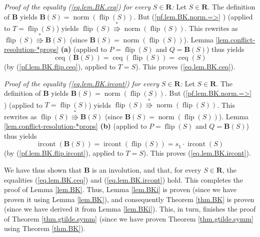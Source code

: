 \documentclass[numbers=enddot,12pt,final,onecolumn,notitlepage]{scrartcl}%
\theoremstyle{definition}
\begin{document}
\textit{Proof of the equality (\ref{eq.lem.BK.ceq}) for every }$S\in
\mathbf{R}$\textit{:} Let $S\in\mathbf{R}$. The definition of $\mathbf{B}$
yields $\mathbf{B}\left(  S\right)  =\operatorname*{norm}\left(
\operatorname*{flip}\left(  S\right)  \right)  $. But (\ref{pf.lem.BK.norm.=>}%
) (applied to $T=\operatorname*{flip}\left(  S\right)  $) yields
$\operatorname*{flip}\left(  S\right)  \overset{\ast}{\Rrightarrow
}\operatorname*{norm}\left(  \operatorname*{flip}\left(  S\right)  \right)  $.
This rewrites as $\operatorname*{flip}\left(  S\right)  \overset{\ast
}{\Rrightarrow}\mathbf{B}\left(  S\right)  $ (since $\mathbf{B}\left(
S\right)  =\operatorname*{norm}\left(  \operatorname*{flip}\left(  S\right)
\right)  $). Lemma \ref{lem.conflict-resolution-*props} \textbf{(a)} (applied
to $P=\operatorname*{flip}\left(  S\right)  $ and $Q=\mathbf{B}\left(
S\right)  $) thus yields
\[
\operatorname*{ceq}\left(  \mathbf{B}\left(  S\right)  \right)
=\operatorname*{ceq}\left(  \operatorname*{flip}\left(  S\right)  \right)
=\operatorname*{ceq}\left(  S\right)
\]
(by (\ref{pf.lem.BK.flip.ceq}), applied to $T=S$). This proves
(\ref{eq.lem.BK.ceq}).

\textit{Proof of the equality (\ref{eq.lem.BK.ircont}) for every }%
$S\in\mathbf{R}$\textit{:} Let $S\in\mathbf{R}$. The definition of
$\mathbf{B}$ yields $\mathbf{B}\left(  S\right)  =\operatorname*{norm}\left(
\operatorname*{flip}\left(  S\right)  \right)  $. But (\ref{pf.lem.BK.norm.=>}%
) (applied to $T=\operatorname*{flip}\left(  S\right)  $) yields
$\operatorname*{flip}\left(  S\right)  \overset{\ast}{\Rrightarrow
}\operatorname*{norm}\left(  \operatorname*{flip}\left(  S\right)  \right)  $.
This rewrites as $\operatorname*{flip}\left(  S\right)  \overset{\ast
}{\Rrightarrow}\mathbf{B}\left(  S\right)  $ (since $\mathbf{B}\left(
S\right)  =\operatorname*{norm}\left(  \operatorname*{flip}\left(  S\right)
\right)  $). Lemma \ref{lem.conflict-resolution-*props} \textbf{(b)} (applied
to $P=\operatorname*{flip}\left(  S\right)  $ and $Q=\mathbf{B}\left(
S\right)  $) thus yields
\[
\operatorname*{ircont}\left(  \mathbf{B}\left(  S\right)  \right)
=\operatorname*{ircont}\left(  \operatorname*{flip}\left(  S\right)  \right)
=s_{1}\cdot\operatorname*{ircont}\left(  S\right)
\]
(by (\ref{pf.lem.BK.flip.ircont}), applied to $T=S$). This proves
(\ref{eq.lem.BK.ircont}).

We have thus shown that $\mathbf{B}$ is an involution, and that, for every
$S\in\mathbf{R}$, the equalities (\ref{eq.lem.BK.ceq}) and
(\ref{eq.lem.BK.ircont}) hold. This completes the proof of Lemma \ref{lem.BK}.
Thus, Lemma \ref{lem.BKi} is proven (since we have proven it using Lemma
\ref{lem.BK}), and consequently Theorem \ref{thm.BK} is proven (since we have
derived it from Lemma \ref{lem.BKi}). This, in turn, finishes the proof of
Theorem \ref{thm.gtilde.symm} (since we have proven Theorem
\ref{thm.gtilde.symm} using Theorem \ref{thm.BK}).
\end{document}
